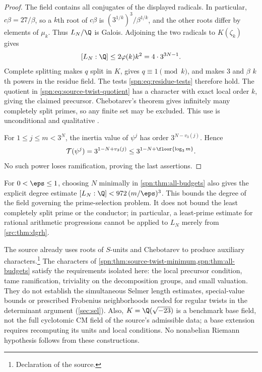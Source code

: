 \begin{proof}
The field contains all conjugates of the displayed radicals. In particular,
$c\beta=27/\beta$, so a $k$th root of $c\beta$ is
$(3^{1/k})^3/\beta^{1/k}$, and the other roots differ by elements of
$\mu_k$. Thus $L_N/\Q$ is Galois. Adjoining the two radicals to $K(\zeta_k)$
gives
\[
 [L_N:\Q]\le2\varphi(k)k^2=4\cdot3^{3N-1}.
\]
Complete splitting makes $q$ split in $K$, gives $q\equiv1\pmod k$, and makes
$3$ and $\beta$ $k$th powers in the residue field. The tests
\eqref{spn:eq:residue-tests} therefore hold. The quotient in
\eqref{spn:eq:source-twist-quotient} has a character with exact local order
$k$, giving the claimed precursor. Chebotarev's theorem gives infinitely many
completely split primes, so any finite set may be excluded. This use is
unconditional and qualitative \cite{Milne2020CFT}.

For $1\le j\le m<3^N$, the inertia value of $\psi^j$ has order
$3^{N-v_3(j)}$. Hence
\[
 \spnTame(\psi^j)=3^{1-N+v_3(j)}\le3^{1-N+\floor{\log_3m}} .
\]
No such power loses ramification, proving the last assertions.
\end{proof}

For $0<\eps\le1$, choosing $N$ minimally in \cref{spn:thm:all-budgets} also
gives the explicit degree estimate $[L_N:\Q]<972\,(m/\eps)^3$. This bounds
the degree of the field governing the prime-selection problem. It does not
bound the least completely split prime or the conductor; in particular, a
least-prime estimate for rational arithmetic progressions cannot be applied
to $L_N$ merely from \cref{src:thm:dgrh}.

\begin{remark}\label{spn:rem:twist-scope}
The source already uses roots of $S$-units and Chebotarev to produce
auxiliary characters.\footnote{Declaration
 of the source.} The
characters of \cref{spn:thm:source-twist-minimum,spn:thm:all-budgets} satisfy
the requirements isolated here: the local precursor condition, tame
ramification, triviality on the decomposition groups, and small valuation. They do not establish the simultaneous Selmer
length estimates, special-value bounds or prescribed Frobenius neighborhoods
needed for regular twists in the determinant argument (\cref{sec:sel}).
Also, $K=\Q(\sqrt{-23})$ is a benchmark base field, not the full cyclotomic
CM field of the source's admissible data; a base extension requires
recomputing its units and local conditions. No nonabelian Riemann hypothesis
follows from these constructions.
\end{remark}

